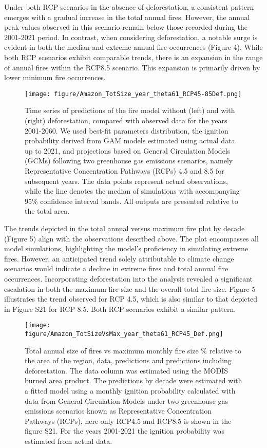 \documentclass[
]{article}
\begin{document}
Under both RCP scenarios in the absence of deforestation, a consistent
pattern emerges with a gradual increase in the total annual fires.
However, the annual peak values observed in this scenario remain below
those recorded during the 2001-2021 period. In contrast, when
considering deforestation, a notable surge is evident in both the median
and extreme annual fire occurrences (Figure 4). While both RCP scenarios
exhibit comparable trends, there is an expansion in the range of annual
fires within the RCP8.5 scenario. This expansion is primarily driven by
lower minimum fire occurrences.

\begin{figure}
\centering
\texttt{[image: figure/Amazon\_TotSize\_year\_theta61\_RCP45-85Def.png]}
\caption{Time series of predictions of the fire model without (left) and
with (right) deforestation, compared with observed data for the years
2001-2060. We used best-fit parameters distribution, the ignition
probability derived from GAM models estimated using actual data up to
2021, and projections based on General Circulation Models (GCMs)
following two greenhouse gas emissions scenarios, namely Representative
Concentration Pathways (RCPs) 4.5 and 8.5 for subsequent years. The data
points represent actual observations, while the line denotes the median
of simulations with accompanying 95\% confidence interval bands. All
outputs are presented relative to the total area.}
\end{figure}

The trends depicted in the total annual versus maximum fire plot by
decade (Figure 5) align with the observations described above. The plot
encompasses all model simulations, highlighting the model's proficiency
in simulating extreme fires. However, an anticipated trend solely
attributable to climate change scenarios would indicate a decline in
extreme fires and total annual fire occurrences. Incorporating
deforestation into the analysis revealed a significant escalation in
both the maximum fire size and the overall total fire size. Figure 5
illustrates the trend observed for RCP 4.5, which is also similar to
that depicted in Figure S21 for RCP 8.5. Both RCP scenarios exhibit a
similar pattern.

\begin{figure}
\centering
\texttt{[image: figure/Amazon\_TotSizeVsMax\_year\_theta61\_RCP45\_Def.png]}
\caption{Total annual size of fires vs maximum monthly fire size \%
relative to the area of the region, data, predictions and predictions
including deforestation. The data column was estimated using the MODIS
burned area product. The predictions by decade were estimated with a
fitted model using a monthly ignition probability calculated with data
from General Circulation Models under two greenhouse gas emissions
scenarios known as Representative Concentration Pathways (RCPs), here
only RCP4.5 and RCP8.5 is shown in the figure S21. For the years
2001-2021 the ignition probability was estimated from actual data.}
\end{figure}
\end{document}
